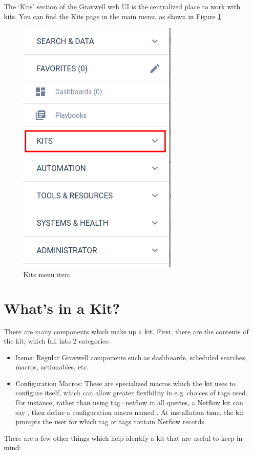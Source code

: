 The `Kits' section of the Gravwell web UI is the centralized place to work with kits. You can find the Kits page in the main menu, as shown in Figure \ref{fig:kit-menu}.

\begin{figure}
	\includegraphics[width=0.3\linewidth]{images/kit-menu.png}
	\caption{Kits menu item}
	\label{fig:kit-menu}
\end{figure}

\section{What's in a Kit?}

There are many components which make up a kit. First, there are the contents of the kit, which fall into 2 categories:

\begin{itemize}
\tightlist
\item
  Items: Regular Gravwell components such as dashboards, scheduled searches, macros, actionables, etc.
\item
  Configuration Macros: These are specialized macros which the kit uses to configure itself, which can allow greater flexibility in e.g. choices of tags used. For instance, rather than using tag=netflow in all queries, a Netflow kit can say , then define a configuration macro named . At installation time, the kit prompts the user for which tag or tags contain Netflow records.
\end{itemize}

There are a few other things which help identify a kit that are useful to keep in mind:

